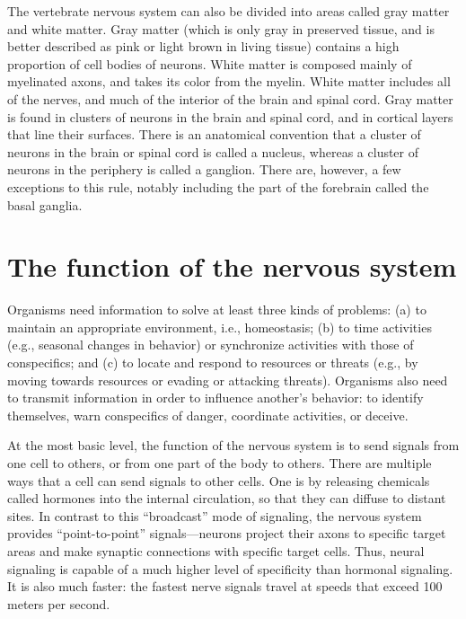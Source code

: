 \documentclass[]{book}
\begin{document}
The vertebrate nervous system can also be divided into areas called gray matter and white matter. Gray matter (which is only gray in preserved tissue, and is better described as pink or light brown in living tissue) contains a high proportion of cell bodies of neurons. White matter is composed mainly of myelinated axons, and takes its color from the myelin. White matter includes all of the nerves, and much of the interior of the brain and spinal cord. Gray matter is found in clusters of neurons in the brain and spinal cord, and in cortical layers that line their surfaces. There is an anatomical convention that a cluster of neurons in the brain or spinal cord is called a nucleus, whereas a cluster of neurons in the periphery is called a ganglion. There are, however, a few exceptions to this rule, notably including the part of the forebrain called the basal ganglia.

\hypertarget{the-function-of-the-nervous-system}{%
\section{The function of the nervous system}\label{the-function-of-the-nervous-system}}

Organisms need information to solve at least three kinds of problems: (a) to maintain an appropriate environment, i.e., homeostasis; (b) to time activities (e.g., seasonal changes in behavior) or synchronize activities with those of conspecifics; and (c) to locate and respond to resources or threats (e.g., by moving towards resources or evading or attacking threats). Organisms also need to transmit information in order to influence another's behavior: to identify themselves, warn conspecifics of danger, coordinate activities, or deceive.

At the most basic level, the function of the nervous system is to send signals from one cell to others, or from one part of the body to others. There are multiple ways that a cell can send signals to other cells. One is by releasing chemicals called hormones into the internal circulation, so that they can diffuse to distant sites. In contrast to this ``broadcast'' mode of signaling, the nervous system provides ``point-to-point'' signals---neurons project their axons to specific target areas and make synaptic connections with specific target cells. Thus, neural signaling is capable of a much higher level of specificity than hormonal signaling. It is also much faster: the fastest nerve signals travel at speeds that exceed 100 meters per second.
\end{document}
